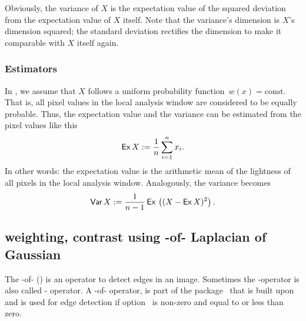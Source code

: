 Obviously, the variance of $X$ is the expectation value of the squared deviation from the
expectation value of $X$ itself.  Note that the variance's dimension is $X$'s dimension squared;
the standard deviation rectifies the dimension to make it comparable with $X$ itself again.


\subsubsection[Estimators]{\label{sec:estimators}%
  Estimators}

In \App{}, we assume that $X$ follows a uniform probability function~$w(x) = \mbox{const.}$ That
is, all pixel values in the local analysis window are considered to be equally probable.  Thus,
the expectation value and the variance can be estimated from the pixel values like this
\[
    \mbox{\textsf{Ex}\,} X := \frac{1}{n} \sum_{i = 1}^n x_i.
\]
\noindent In other words: the expectation value is the arithmetic mean of the lightness of all
pixels in the local analysis window.  Analogously, the variance becomes
\[
    \mbox{\textsf{Var}\,} X :=
    \frac{1}{n - 1} \, \mbox{\textsf{Ex}\,}\left( (X - \mbox{\textsf{Ex}\,} X)^2 \right).
\]


\subsection[Laplacian of Gaussian]{\label{sec:laplacian-of-gaussian}%
         {weighting, contrast using -of-}%
  Laplacian of Gaussian}

%
%
\begin{sloppypar}
  The -of- () is an operator to detect
  edges in an image.  Sometimes the -operator is also called
  - operator.  A
  -of- operator,
   is part of the
  package~ that \App{} is built upon and is used for edge
  detection if option~ is non-zero and
   equal to or less than zero.
\end{sloppypar}

